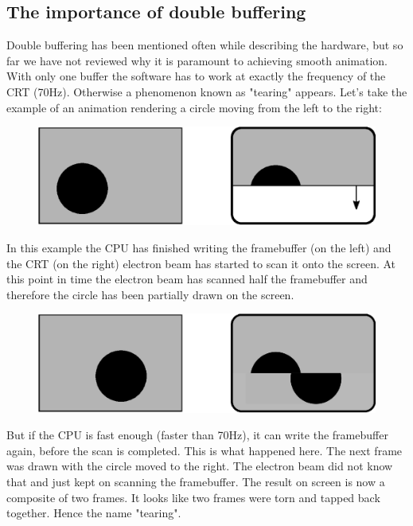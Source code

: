 \documentclass[book.tex]{subfiles}
\begin{document}
\subsection{The importance of double buffering}
Double buffering has been mentioned often while describing the hardware, but so far we have not reviewed why it is paramount to achieving smooth animation. With only one buffer the software has to work at exactly the frequency of the CRT (70Hz). Otherwise a phenomenon known as "tearing" appears. Let's take the example of an animation rendering a circle moving from the left to the right:
\par
\begin{figure}[H]
\centering
\includegraphics[width=\textwidth]{imgs/drawings/doublebuffer_before.eps}
\end{figure}
\par
In this example the CPU has finished writing the framebuffer (on the left) and the CRT (on the right) electron beam has started to scan it onto the screen. At this point in time the electron beam has scanned half the framebuffer and therefore the circle has been partially drawn on the screen.
\par
\begin{figure}[H]
\centering
\includegraphics[width=\textwidth]{imgs/drawings/doublebuffer_after.eps}
\end{figure}
\par
But if the CPU is fast enough (faster than 70Hz), it can write the framebuffer again, before the scan is completed. This is what happened here. The next frame was drawn with the circle moved to the right. The electron beam did not know that and just kept on scanning the framebuffer. The result on screen is now a composite of two frames. It looks like two frames were torn and tapped back together. Hence the name "tearing".\\
\end{document}
